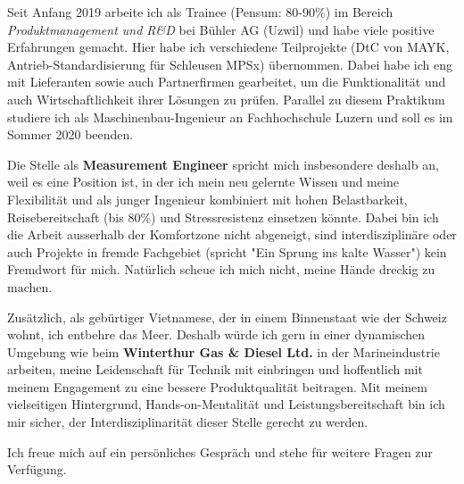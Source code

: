 \documentclass[11pt, a4paper]{awesome-cv}
\newcommand{\companyName}{Winterthur Gas \& Diesel Ltd.}
\newcommand{\jobPosition}{Measurement Engineer}
\begin{document}
\makecvheader

\makelettertitle

\begin{cvletter}
	
Seit Anfang 2019 arbeite ich als Trainee (Pensum: 80-90\%) im Bereich \textit{Produktmanagement und R\&D} bei Bühler AG (Uzwil) und habe viele positive Erfahrungen gemacht. Hier habe ich verschiedene Teilprojekte (DtC von MAYK, Antrieb-Standardisierung für Schleusen MPSx) übernommen. Dabei habe ich eng mit Lieferanten sowie auch Partnerfirmen gearbeitet, um die Funktionalität und auch Wirtschaftlichkeit ihrer Lösungen zu prüfen. Parallel zu diesem Praktikum studiere ich als Maschinenbau-Ingenieur an Fachhochschule Luzern und soll es im Sommer 2020 beenden.

Die Stelle als \textbf{\jobPosition} spricht mich insbesondere deshalb an, weil es eine Position ist, in der ich mein neu gelernte Wissen und meine Flexibilität und als junger Ingenieur kombiniert mit hohen Belastbarkeit, Reisebereitschaft (bis 80\%) und Stressresistenz einsetzen könnte. Dabei bin ich die Arbeit ausserhalb der Komfortzone nicht abgeneigt, sind interdisziplinäre oder auch Projekte in fremde Fachgebiet (spricht "Ein Sprung ins kalte Wasser") kein Fremdwort für mich. Natürlich scheue ich mich nicht, meine Hände dreckig zu machen.

Zusätzlich, als gebürtiger Vietnamese, der in einem Binnenstaat wie der Schweiz wohnt, ich entbehre das Meer. Deshalb würde ich gern in einer dynamischen Umgebung wie beim \textbf{\companyName} in der Marineindustrie arbeiten, meine Leidenschaft für Technik mit einbringen und hoffentlich mit meinem Engagement zu eine bessere Produktqualität beitragen. Mit meinem vielseitigen Hintergrund, Hands-on-Mentalität und Leistungsbereitschaft bin ich mir sicher, der Interdisziplinarität dieser Stelle gerecht zu werden. 

Ich freue mich auf ein persönliches Gespräch und stehe für weitere Fragen zur Verfügung.

\end{cvletter}

\makeletterclosing
\end{document}
